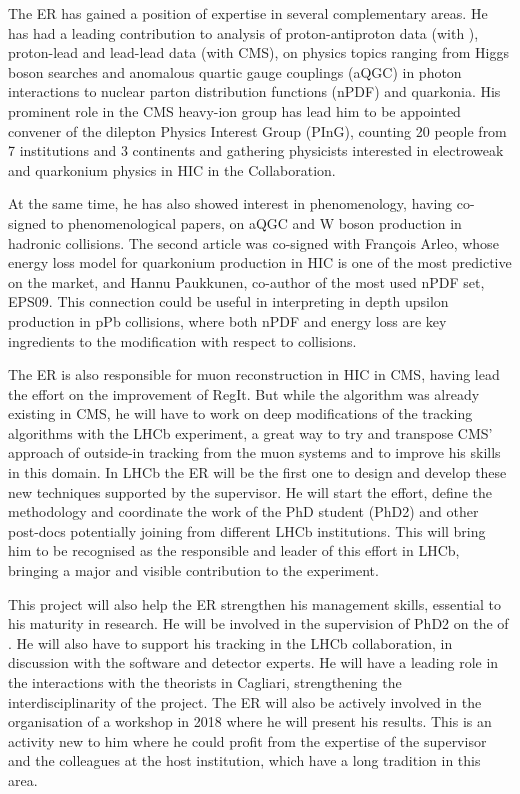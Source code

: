 \documentclass[a4paper,11pt]{article}
\newcommand{\ER}{ER\xspace}
\newcommand{\supervisor}{the supervisor\xspace}
\begin{document}
The \ER has gained a position of expertise in several complementary areas. He has had a leading contribution to analysis of proton-antiproton data (with \DO), proton-lead and lead-lead data (with CMS), on physics topics ranging from Higgs boson searches and anomalous quartic gauge couplings (aQGC) in photon interactions to nuclear parton distribution functions (nPDF) and quarkonia. His prominent role in the CMS heavy-ion group has lead him to be appointed convener of the dilepton Physics Interest Group (PInG), counting 20 people from 7 institutions and 3 continents and gathering physicists interested in electroweak and quarkonium physics in HIC in the Collaboration.

At the same time, he has also showed interest in phenomenology, having co-signed to phenomenological papers, on aQGC and W boson production in hadronic collisions. The second article was co-signed with François Arleo, whose energy loss model for quarkonium production in HIC is one of the most predictive on the market, and Hannu Paukkunen, co-author of the most used nPDF set, EPS09. This connection could be useful in interpreting in depth upsilon production in pPb collisions, where both nPDF and energy loss are key ingredients to the modification with respect to \pp collisions.

The \ER is also responsible for muon reconstruction in HIC in CMS,
having lead the effort on the improvement of RegIt. But while the
algorithm was already existing in CMS, he will have to work on deep
modifications of the tracking algorithms with the LHCb experiment, a
great way to try and transpose CMS' approach of outside-in tracking
from the muon systems and to improve his skills in this domain. In 
LHCb the \ER will be the first one to design and develop these new
techniques supported by the supervisor. He will start the effort, define 
the methodology and coordinate the work of the PhD student (PhD2) and other 
post-docs potentially joining from different LHCb institutions.
This will bring him to be recognised as the responsible and leader 
of this effort
in LHCb, bringing a major and visible contribution to the experiment.

This project will also help the \ER strengthen his management skills, essential to his maturity in research. He will be involved in the supervision of PhD2 on the \rpa of \PgUabc. He will also have to support his \pbpb tracking in the LHCb collaboration, in discussion with the software and detector experts. He will 
have a leading role in the interactions with the theorists in Cagliari, strengthening the interdisciplinarity of the project. The \ER will also be actively involved in the organisation of a workshop in 2018 where he will present his 
results. This is an activity new to him where he could profit from the 
expertise of \supervisor and the colleagues at the host institution, which 
have a long tradition in this area.
\end{document}
